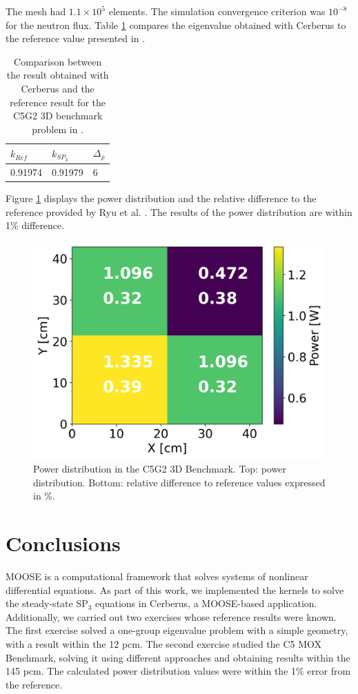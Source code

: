 \documentclass{anstrans}
\begin{document}
The mesh had $1.1 \times 10^{5}$ elements.
The simulation convergence criterion was $10^{-8}$ for the neutron flux.
Table \ref{tab:keff-4th} compares the eigenvalue obtained with Cerberus to the reference value presented in \cite{ryu_finite_2013}.

\begin{table}[htbp!]
    \centering
    \caption{Comparison between the result obtained with Cerberus and the reference result for the C5G2 3D benchmark problem in \cite{ryu_finite_2013}.}
    \label{tab:keff-4th}
    \begin{tabular}{lll}
    \toprule
        $k_{Ref}$   & $k_{SP_3}$    & $\Delta_{\rho}$   \\
    \midrule
        0.91974     & 0.91979       & 6                 \\
    \bottomrule
    \end{tabular}
\end{table}

Figure \ref{fig:c5g2-3d-power} displays the power distribution and the relative
difference to the reference provided by Ryu et al. \cite{ryu_finite_2013}.
The results of the power distribution are within 1\% difference.

\begin{figure}[h] %
    \centering
    \includegraphics[width=0.65\linewidth]{figures/C5G23D-distrib.png}
    \hfill
    \caption{Power distribution in the C5G2 3D Benchmark. Top: power distribution. Bottom: relative difference to reference values expressed in \%.}
    \label{fig:c5g2-3d-power}
\end{figure}


\section{Conclusions}

MOOSE is a computational framework that solves systems of nonlinear differential equations.
As part of this work, we implemented the kernels to solve the steady-state SP$_3$ equations in Cerberus, a MOOSE-based application.
Additionally, we carried out two exercises whose reference results were known.
The first exercise solved a one-group eigenvalue problem with a simple geometry, with a result within the 12 pcm.
The second exercise studied the C5 MOX Benchmark, solving it using different approaches and obtaining results within the 145 pcm.
The calculated power distribution values were within the 1\% error from the reference.
\end{document}
